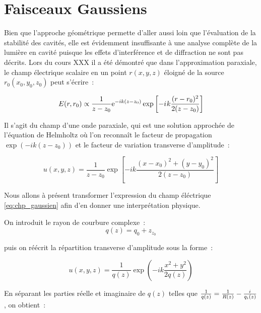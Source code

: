 \documentclass[a4paper]{book}
\newcommand{\iu}{{i\mkern1mu}}
\begin{document}
\chapter{Faisceaux Gaussiens}

Bien que l'approche géométrique permette d'aller aussi loin que l'évaluation de la stabilité des cavités, elle est évidemment insuffisante à une analyse complète de la lumière en cavité puisque les effets d'interférence et de diffraction ne sont pas décrits. Lors du cours XXX il a été démontré que dans l'approximation paraxiale, le champ électrique scalaire en un point $r(x, y, z)$ éloigné de la source $r_0(x_0, y_0, z_0)$ peut s'écrire~: 

\begin{equation}
    E(r,r_0) \propto \frac{1}{z-z_0}\mathrm{e}^{-ik(z-z_0)}\exp\left[-\iu k\frac{(r - r_0)^2}{2(z - z_0)}\right]
    \label{eq:chp_gaussien}
\end{equation}


Il s'agit du champ d'une onde paraxiale, qui est une solution approchée de l'équation de Helmholtz où l'on reconnaît le facteur de propagation $\exp(-ik(z-z_0))$ et le facteur de variation transverse d'amplitude~:

\begin{equation}
    u(x, y, z) = \frac{1}{z-z_0}\exp\left[-ik\frac{(x-x_0)^2+(y-y_0)^2}{2(z-z_0)}\right]
\end{equation}

Nous allons à présent transformer l'expression du champ éléctrique \ref{eq:chp_gaussien} afin d'en donner une interprétation physique. 

On introduit le rayon de courbure complexe~: 
\begin{equation}
    q(z)=q_0+z_{z_{0}}
\end{equation}

puis on réécrit la répartition transverse d'amplitude sous la forme~: 

\begin{equation}
    u(x, y, z) = \frac{1}{q(z)}\exp\left(-ik\frac{x^2+y^2}{2q(z)}\right)
\end{equation}

En séparant les parties réelle et imaginaire de $q(z)$ telles que $\frac{1}{q(z)}=\frac{1}{R(z)}-\frac{\iu}{q_i(z)}$, on obtient~:
\end{document}
